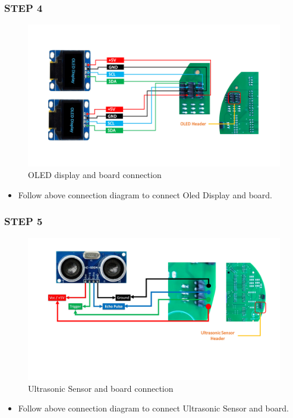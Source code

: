 \documentclass[12pt,a4paper,oneside]{book}
\begin{document}
		\subsubsection*{STEP 4}
				\begin{figure}[H]
					\begin{center}
						\includegraphics[scale=0.50]{OLED_Connection}
						\caption{OLED display and board connection}
					\end{center}
				\end{figure}
				\begin{itemize}
					\item Follow above connection diagram to connect Oled Display and board.
				\end{itemize}

		\subsubsection*{STEP 5}
				\begin{figure}[H]
					\begin{center}
						\includegraphics[scale=0.50]{Ultrasonic_connection}
						\caption{Ultrasonic Sensor and board connection}
					\end{center}
				\end{figure}
				\begin{itemize}
					\item Follow above connection diagram to connect Ultrasonic Sensor and board.
				\end{itemize}
\end{document}
